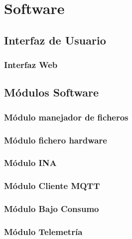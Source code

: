 \section{Software}

\subsection{Interfaz de Usuario}
\subsubsection{Interfaz Web}


\subsection{Módulos Software}
\subsubsection{Módulo manejador de ficheros}


\subsubsection{Módulo fichero hardware}


\subsubsection{Módulo INA}


\subsubsection{Módulo Cliente MQTT}


\subsubsection{Módulo Bajo Consumo}


\subsubsection{Módulo Telemetría}



